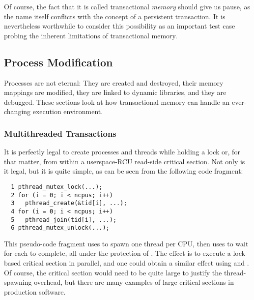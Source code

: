 Of course, the fact that it is called transactional \emph{memory}
should give us pause, as the name itself conflicts with the concept of
a persistent transaction.
It is nevertheless worthwhile to consider this possibility as an important
test case probing the inherent limitations of transactional memory.

\subsection{Process Modification}
\label{sec:future:Process Modification}

Processes are not eternal:
They are created and destroyed, their memory mappings are modified,
they are linked to dynamic libraries, and they are debugged.
These sections look at how transactional memory can handle an
ever-changing execution environment.

\subsubsection{Multithreaded Transactions}
\label{sec:future:Multithreaded Transactions}

It is perfectly legal to create processes and threads while holding
a lock or, for that matter, from within a userspace-RCU read-side critical
section.
Not only is it legal, but it is quite simple, as can be seen from the
following code fragment:

\vspace{5pt}
\begin{minipage}[t]{\columnwidth}
\small
\begin{verbatim}
  1 pthread_mutex_lock(...);
  2 for (i = 0; i < ncpus; i++)
  3   pthread_create(&tid[i], ...);
  4 for (i = 0; i < ncpus; i++)
  5   pthread_join(tid[i], ...);
  6 pthread_mutex_unlock(...);
\end{verbatim}
\end{minipage}
\vspace{5pt}

This pseudo-code fragment uses  to spawn one thread
per CPU, then uses  to wait for each to complete,
all under the protection of .
The effect is to execute a lock-based critical section in parallel,
and one could obtain a similar effect using  and .
Of course, the critical section would need to be quite large to justify
the thread-spawning overhead, but there are many examples of large
critical sections in production software.

